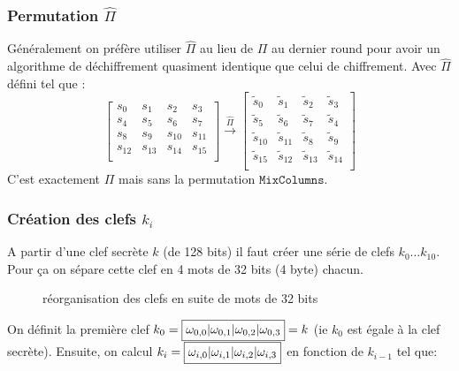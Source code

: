 \documentclass[a4paper, 12pt]{article}
\begin{document}
\subsubsection{Permutation $\hat{\Pi}$}
Généralement on préfère utiliser $\hat{\Pi}$ au lieu de $\Pi$  au dernier round pour avoir un algorithme de déchiffrement quasiment identique que celui de chiffrement. Avec $\hat{\Pi}$ défini tel que :
$$
\begin{bmatrix}
	s_{0} & s_{1} & s_{2} & s_{3} \\
	s_{4} & s_{5} & s_{6} & s_{7} \\
	s_{8} & s_{9} & s_{10} & s_{11} \\
	s_{12} & s_{13} & s_{14} & s_{15} \\
\end{bmatrix}
\overset{\hat{\Pi}}{\rightarrow}
\begin{bmatrix}
	\tilde{s}_0 & \tilde{s}_1 & \tilde{s}_2 & \tilde{s}_3 \\
	\tilde{s}_5 & \tilde{s}_6 & \tilde{s}_7 & \tilde{s}_4 \\
	\tilde{s}_{10} & \tilde{s}_{11} & \tilde{s}_8 & \tilde{s}_9 \\
	\tilde{s}_{15} & \tilde{s}_{12} & \tilde{s}_{13} & \tilde{s}_{14} \\
\end{bmatrix}
$$
C'est exactement $\Pi$ mais sans la permutation $\mathtt{MixColumns}$. 

\subsubsection{Création des clefs $k_i$}\label{clefki}
A partir d'une clef secrète $k$ (de 128 bits) il faut créer une série de clefs $k_0\dots k_{10}$.
Pour ça on sépare cette clef en 4 mots de 32 bits (4 byte) chacun.

\begin{figure}[h]
\centering
{}
\caption{réorganisation des clefs en suite de mots de 32 bits}
\label{illu_clef}
\end{figure}
On définit la première clef $k_0 = \fbox{$\omega_{0,0}|\omega_{0,1}|\omega_{0,2}|\omega_{0,3}$} = k$ (ie $k_0$ est égale à la clef secrète). Ensuite, on calcul $k_i = \fbox{$\omega_{i,0}|\omega_{i,1}|\omega_{i,2}|\omega_{i,3}$}$ en fonction de $k_{i-1}$ tel que:
\end{document}
